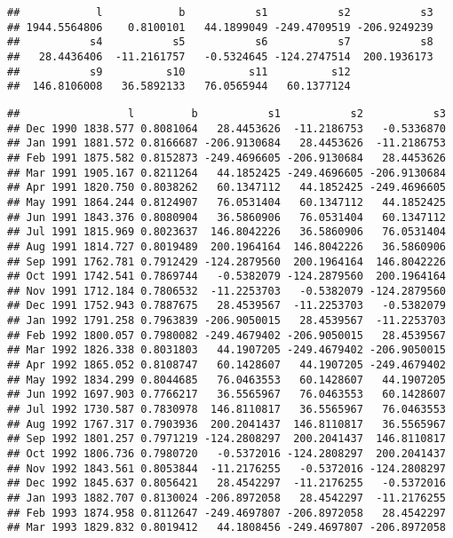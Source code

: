 \documentclass[]{article}
\begin{document}
\begin{verbatim}
##            l            b           s1           s2           s3 
## 1944.5564806    0.8100101   44.1899049 -249.4709519 -206.9249239 
##           s4           s5           s6           s7           s8 
##   28.4436406  -11.2161757   -0.5324645 -124.2747514  200.1936173 
##           s9          s10          s11          s12 
##  146.8106008   36.5892133   76.0565944   60.1377124
\end{verbatim}

\begin{verbatim}
##                 l         b           s1           s2           s3
## Dec 1990 1838.577 0.8081064   28.4453626  -11.2186753   -0.5336870
## Jan 1991 1881.572 0.8166687 -206.9130684   28.4453626  -11.2186753
## Feb 1991 1875.582 0.8152873 -249.4696605 -206.9130684   28.4453626
## Mar 1991 1905.167 0.8211264   44.1852425 -249.4696605 -206.9130684
## Apr 1991 1820.750 0.8038262   60.1347112   44.1852425 -249.4696605
## May 1991 1864.244 0.8124907   76.0531404   60.1347112   44.1852425
## Jun 1991 1843.376 0.8080904   36.5860906   76.0531404   60.1347112
## Jul 1991 1815.969 0.8023637  146.8042226   36.5860906   76.0531404
## Aug 1991 1814.727 0.8019489  200.1964164  146.8042226   36.5860906
## Sep 1991 1762.781 0.7912429 -124.2879560  200.1964164  146.8042226
## Oct 1991 1742.541 0.7869744   -0.5382079 -124.2879560  200.1964164
## Nov 1991 1712.184 0.7806532  -11.2253703   -0.5382079 -124.2879560
## Dec 1991 1752.943 0.7887675   28.4539567  -11.2253703   -0.5382079
## Jan 1992 1791.258 0.7963839 -206.9050015   28.4539567  -11.2253703
## Feb 1992 1800.057 0.7980082 -249.4679402 -206.9050015   28.4539567
## Mar 1992 1826.338 0.8031803   44.1907205 -249.4679402 -206.9050015
## Apr 1992 1865.052 0.8108747   60.1428607   44.1907205 -249.4679402
## May 1992 1834.299 0.8044685   76.0463553   60.1428607   44.1907205
## Jun 1992 1697.903 0.7766217   36.5565967   76.0463553   60.1428607
## Jul 1992 1730.587 0.7830978  146.8110817   36.5565967   76.0463553
## Aug 1992 1767.317 0.7903936  200.2041437  146.8110817   36.5565967
## Sep 1992 1801.257 0.7971219 -124.2808297  200.2041437  146.8110817
## Oct 1992 1806.736 0.7980720   -0.5372016 -124.2808297  200.2041437
## Nov 1992 1843.561 0.8053844  -11.2176255   -0.5372016 -124.2808297
## Dec 1992 1845.637 0.8056421   28.4542297  -11.2176255   -0.5372016
## Jan 1993 1882.707 0.8130024 -206.8972058   28.4542297  -11.2176255
## Feb 1993 1874.958 0.8112647 -249.4697807 -206.8972058   28.4542297
## Mar 1993 1829.832 0.8019412   44.1808456 -249.4697807 -206.8972058

\end{verbatim}
\end{document}
